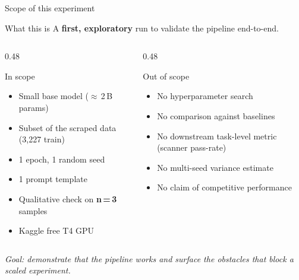 \documentclass[aspectratio=169, 10pt]{beamer}
\begin{document}
\begin{frame}{Scope of this experiment}
  \begin{block}{What this is}
    A \textbf{first, exploratory} run to validate the pipeline end-to-end.
  \end{block}
  \begin{columns}[T]
    \begin{column}{0.48\textwidth}
      \begin{exampleblock}{In scope}
        \scriptsize
        \begin{itemize}
          \item Small base model ($\approx$\,2\,B params)
          \item Subset of the scraped data (3{,}227 train)
          \item 1 epoch, 1 random seed
          \item 1 prompt template
          \item Qualitative check on \textbf{n\,=\,3} samples
          \item Kaggle free T4 GPU
        \end{itemize}
      \end{exampleblock}
    \end{column}
    \begin{column}{0.48\textwidth}
      \begin{alertblock}{Out of scope}
        \scriptsize
        \begin{itemize}
          \item No hyperparameter search
          \item No comparison against baselines
          \item No downstream task-level metric
                (scanner pass-rate)
          \item No multi-seed variance estimate
          \item No claim of competitive performance
        \end{itemize}
      \end{alertblock}
    \end{column}
  \end{columns}
  \vspace{0.3em}
  \begin{center}
    \scriptsize\color{sfaxblue}\itshape
    Goal: demonstrate that the pipeline works and surface the obstacles
    that block a scaled experiment.
  \end{center}
\end{frame}
\end{document}
